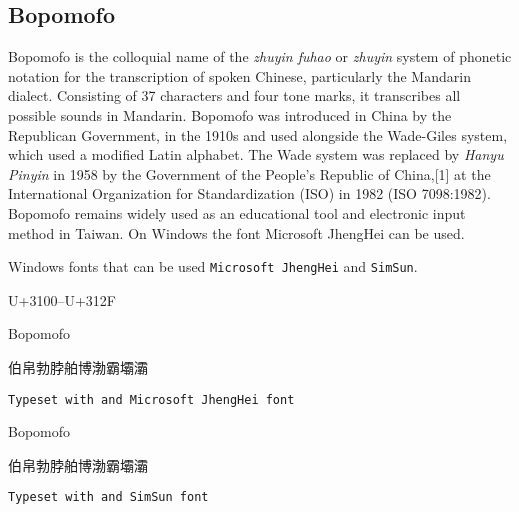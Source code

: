 

\subsection{Bopomofo}

Bopomofo is the colloquial name of the \textit{zhuyin fuhao} or \textit{zhuyin} system of phonetic notation for the transcription of spoken Chinese, particularly the Mandarin dialect. Consisting of 37 characters and four tone marks, it transcribes all possible sounds in Mandarin. Bopomofo was introduced in China by the Republican Government, in the 1910s and used alongside the Wade-Giles system, which used a modified Latin alphabet. The Wade system was replaced by \textit{Hanyu Pinyin} in 1958 by the Government of the People's Republic of China,[1] at the International Organization for Standardization (ISO) in 1982 (ISO 7098:1982). Bopomofo remains widely used as an educational tool and electronic input method in Taiwan. On Windows the font Microsoft JhengHei can be used. 

Windows fonts that can be used \texttt{Microsoft JhengHei} and \texttt{SimSun}.

U+3100–U+312F
\newfontfamily{}

\begin{scriptexample}[]{Bopomofo}
{\centering\bopomofo 

伯帛勃脖舶博渤霸壩灞

}

\hfill \texttt{Typeset with \cmd{\bopomofo} and Microsoft JhengHei font }
\end{scriptexample}

\begin{scriptexample}[]{Bopomofo}
\newfontfamily{}
{\centering\simsun 

伯帛勃脖舶博渤霸壩灞

}
\hfill \texttt{Typeset with \cmd{\bopomofo} and SimSun font }
\end{scriptexample}


